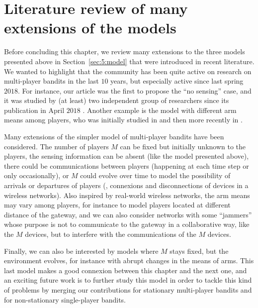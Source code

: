 \section{Literature review of many extensions of the models}
\label{sec:5:literatureReviewOtherModels}

Before concluding this chapter, we review many extensions to the three models presented above in Section~\ref{sec:5:model} that were introduced in recent literature.
%
We wanted to highlight that the community has been quite active on research on multi-player bandits in the last $10$ years, but especially active since last spring $2018$.
For instance, our article \cite{Besson2018ALT} was the first to propose the ``no sensing'' case, and it was studied by (at least) two independent group of researchers since its publication in April $2018$ \cite{BoursierPerchet18,LugosiMehrabian18}.
Another example is the model with different arm means among players, who was initially studied in \cite{Anandkumar10,Kalathil12} and then more recently in \cite{Bistritz18,KaufmannAbbas19}.
%

Many extensions of the simpler model of multi-player bandits have been considered.
The number of players $M$ can be fixed but initially unknown to the players, the sensing information can be absent (like the model \modeltrois{} presented above), there could be communications between players (happening at each time step or only occasionally), or $M$ could evolve over time to model the possibility of arrivals or departures of players (\ie, connexions and disconnections of devices in a wireless networks).
Also inspired by real-world wireless networks, the arm means may vary among players, for instance to model players located at different distance of the gateway, and we can also consider networks with some ``jammers'' whose purpose is not to communicate to the gateway in a collaborative way, like the $M$ devices, but to interfere with the communications of the $M$ devices.

Finally, we can also be interested by models where $M$ stays fixed, but the environment evolves, for instance with abrupt changes in the means of arms. This last model makes a good connexion between this chapter and the next one, and an exciting future work is to further study this model in order to tackle this kind of problems by merging our contributions for stationary multi-player bandits and for non-stationary single-player bandits.

